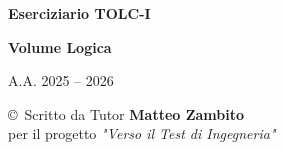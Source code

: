 \documentclass[20pt, a4paper]{article}
\begin{document}
\begin{titlepage}
    \centering
    \vspace*{2cm}
    {\Huge \textbf{Eserciziario TOLC-I} \par}
    \vspace{1cm}
    {\Large \textbf{Volume Logica} \par}
    \vspace{4cm}
    {\Large A.A. 2025 -- 2026 \par}
    \vspace{4cm}
    \vfill
    {\large \copyright \ Scritto da Tutor \textbf{Matteo Zambito} \\
    per il progetto \textit{"Verso il Test di Ingegneria"} \par}
\end{titlepage}

\newpage
\tableofcontents
\newpage
\end{document}
